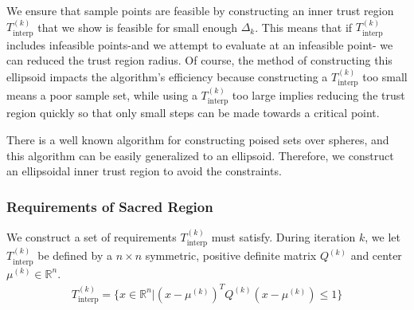 \documentclass{article}
\theoremstyle{case}
\newcommand{\Rn}{\mathbb R^n}
\newcommand{\dk}{\Delta_k}
\newcommand{\qk}{{Q^{(k)}}}
\newcommand{\sampletrk}{{T_{\text{interp}}^{(k)}}}
\newcommand{\centerk}{{\mu^{(k)}}}
\begin{document}
We ensure that sample points are feasible by constructing an inner trust region $\sampletrk$ that we show is feasible for small enough $\dk$.
This means that if $\sampletrk$ includes infeasible points-and we attempt to evaluate at an infeasible point- we can reduced the trust region radius.
Of course, the method of constructing this ellipsoid impacts the algorithm's efficiency because constructing a $\sampletrk$ too small means a poor sample set,
while using a $\sampletrk$ too large implies reducing the trust region quickly so that only small steps can be made towards a critical point.

There is a well known algorithm for constructing poised sets over spheres, and this algorithm can be easily generalized to an ellipsoid.
Therefore, we construct an ellipsoidal inner trust region to avoid the constraints.


\subsubsection{Requirements of Sacred Region}
\label{ellipsoid_requirements}
We construct a set of requirements $\sampletrk$ must satisfy.
During iteration $k$, we let $\sampletrk$ be defined by a $n\times n$ symmetric, positive definite matrix $\qk$ and center $\centerk \in \Rn$.
\begin{align}
\sampletrk = \{x \in \Rn | (x - \centerk)^T \qk(x - \centerk) \le 1 \}
\end{align}
\end{document}

